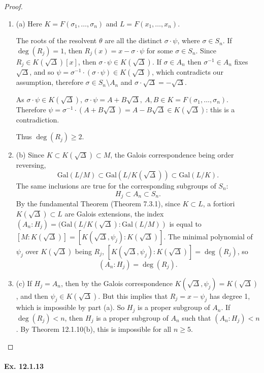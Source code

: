\documentclass[11pt,a4paper]{article}
\newcommand{\be} {\begin{enumerate}}
\newcommand{\ee} {\end{enumerate}}
\newcommand{\Gal}{\mathrm{Gal}}
\begin{document}
\begin{proof}
\be
\item[(a)]
Here $K = F(\sigma_1,\ldots,\sigma_n)$ and $L = F(x_1,\ldots,x_n)$.

The roots of the resolvent $\theta$ are all the distinct $\sigma \cdot \psi$, where $\sigma \in S_n$. If $\deg(R_j)=1$, then $R_j(x) = x - \sigma \cdot \psi$ for some $\sigma \in S_n$. Since $R_j \in K(\sqrt{\Delta})[x]$, then $\sigma \cdot \psi \in K(\sqrt{\Delta})$. If $\sigma \in A_n$ then $\sigma^{-1} \in A_n$ fixes $\sqrt{\Delta}$,  and so $\psi = \sigma^{-1} \cdot (\sigma \cdot \psi) \in K(\sqrt{\Delta})$, which contradicts our assumption, therefore $\sigma \in S_n \setminus A_n$ and $\sigma \cdot \sqrt{\Delta} = - \sqrt{\Delta}$.

As $\sigma \cdot \psi \in K(\sqrt{\Delta})$, $\sigma \cdot \psi = A + B \sqrt{\Delta}, \ A,B \in K = F(\sigma_1,\ldots,\sigma_n)$. Therefore $\psi = \sigma^{-1}\cdot (A+B \sqrt{\Delta}) = A - B \sqrt{\Delta} \in K(\sqrt{\Delta})$: this is a contradiction.

Thus $\deg(R_j) \geq 2$.

\item[(b)] Since $K \subset K(\sqrt{\Delta}) \subset M$, the Galois correspondence being order reversing,
$$\Gal(L/M) \subset \Gal(L/K(\sqrt{\Delta})) \subset \Gal(L/K).$$
The same inclusions are true for the corresponding subgroups of $S_n$:
$$H_j \subset A_n \subset S_n.$$
By the fundamental Theorem (Theorem 7.3.1), since $K \subset L$, a fortiori $K(\sqrt{\Delta}) \subset L$ are Galois extensions,  the index  $(A_n:H_j) = (\Gal(L/K(\sqrt{\Delta}) : \Gal(L/M))$ is equal to $[M : K(\sqrt{\Delta})] = [K(\sqrt{\Delta},\psi_j ): K(\sqrt{\Delta})]$. The minimal polynomial of $\psi_j$ over $K(\sqrt{\Delta})$ being $R_j$, $[K(\sqrt{\Delta},\psi_j):K(\sqrt{\Delta})] = \deg(R_j)$, so
$$(A_n:H_j) = \deg(R_j).$$

\item[(c)] If $H_j = A_n$, then by the Galois correspondence $K(\sqrt{\Delta},\psi_j) = K(\sqrt{\Delta})$, and then $\psi_j \in K(\sqrt{\Delta})$. But this implies that $R_j = x - \psi_j$ has degree 1, which is impossible by part (a). So $H_j$ is a proper subgroup of $A_n$.  If $\deg(R_j) < n$, then $H_j$ is a proper subgroup of $A_n$ such that $(A_n:H_j) <n$. By Theorem 12.1.10(b), this is impossible for all $n\geq 5$.
\ee
\end{proof}

\paragraph{Ex. 12.1.13}
\end{document}

